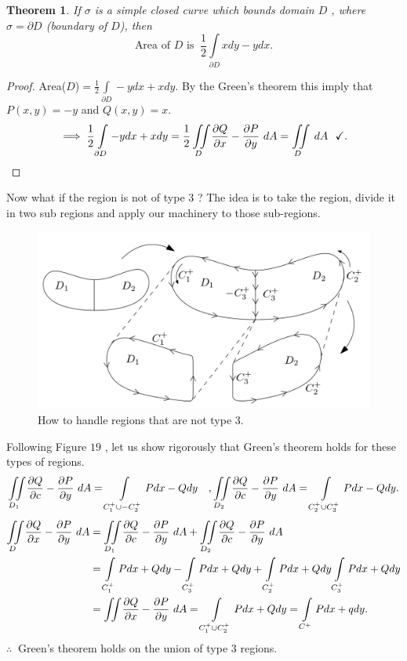 \documentclass[
	12pt,
	]{article}
\theoremstyle{custom}
\newtheorem{theorem}{Theorem}[section]
\theoremstyle{custom}
\theoremstyle{custom}
\theoremstyle{custom}
\theoremstyle{custom}
\theoremstyle{definition}
\theoremstyle{example}
\theoremstyle{note}
\theoremstyle{remark}
\theoremstyle{example}
\newcounter{theo}[section]\setcounter{theo}{0}
\numberwithin{equation}{subsection}
\begin{document}
  				\begin{theorem}
	  				If $\sigma$ is a simple closed curve which bounds domain $D$ , where $\sigma = \partial D$ (boundary of $D$), then 
	  				\begin{equation} 
	  				\text{Area of $D$ is } \ \frac12 \int\limits_{\partial D} xdy -y dx.
	  				\end{equation}
  				\end{theorem}
  				
  				\begin{proof}
  					Area($D$)$= \frac12 \int\limits_{\partial D} -ydx + xdy.$ By the Green's theorem this imply that $P(x,y) = -y$ and $Q(x,y) = x$.
  					$$ \implies \frac12 \int\limits_{\partial D}-ydx + xdy = \frac12 \iint\limits_{D} \pdv{Q}{x} - \pdv{P}{y} \ dA = \iint\limits_{D} \ dA \ \ \checkmark.$$
  				\end{proof}
  				
  				\noindent Now what if the region is not of type $3$ ? The idea is to take the region, divide it in two sub regions and apply our machinery to those sub-regions. 
  				
  				\begin{figure}[H]
  					\centering
  					\includegraphics[width=0.8\linewidth]{MATH314_Notes_Triple_Integral_Example8_Figure.png}
  					\captionsetup{margin=1cm}
  					\caption{How to handle regions that are not type $3$.}
  				\end{figure}
  				
  				\noindent Following Figure $19$ , let us show rigorously that Green's theorem holds for these types of regions. 
  				$$ \iint\limits_{D_{1}}\pdv{Q}{c} - \pdv{P}{y} \ dA = \int\limits_{C_{1}^{+}\cup -C_{3}^{+}} Pdx - Qdy \quad , \iint\limits_{D_{2}}\pdv{Q}{c} - \pdv{P}{y} \ dA = \int\limits_{C_{2}^{+}\cup C_{3}^{+}} Pdx - Qdy .$$
  				\begin{align*}
  					\iint\limits_D \pdv{Q}{x} - \pdv{P}{y} \ dA &= \iint\limits_{D_{1}}\pdv{Q}{c} - \pdv{P}{y} \ dA +  \iint\limits_{D_{2}}\pdv{Q}{c} - \pdv{P}{y} \ dA  \\
  					&= \int\limits_{C_{1}^{+}} Pdx + Qdy -\int\limits_{C_{3}^{+}} Pdx + Qdy + \int\limits_{C_{2}^{+}} Pdx + Qdy  \int\limits_{C_{3}^{+}} Pdx + Qdy  \\
  					&= \iint \pdv{Q}{x} - \pdv{P}{y} \ dA = \int\limits_{C_{1}^{+}\cup C_{2}^{+}} Pdx + Qdy = \int\limits_{C^{+}}Pdx +qdy.
  				\end{align*}
  				$\therefore \ $ Green's theorem holds on the union of type $3$ regions.
  				
\end{document}
